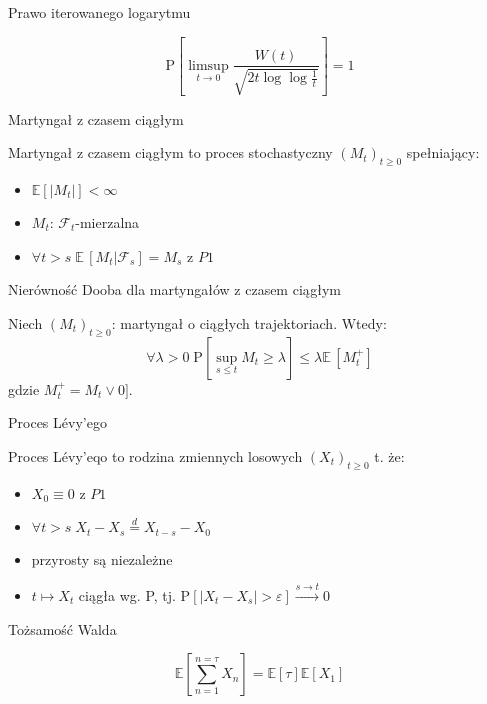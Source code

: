 \documentclass[avery5371,grid,frame]{flashcards}
\begin{document}
\begin{flashcard}[Twierdzenie]{Prawo iterowanego logarytmu}

\smallskip
$$ \text{P} \left[ \limsup _{t \rightarrow 0} \frac{W(t)}{\sqrt{2t \log \log \frac{1}{t} }} \right] = 1 $$
\end{flashcard}


\begin{flashcard}[Definicja]{Martyngał z czasem ciągłym}

\smallskip
Martyngał z czasem ciągłym to proces stochastyczny $(M_t)_{t \geq 0}$ spełniający:
\begin{itemize}
\item $\mathbb{E} [|M_t|] < \infty$
\item $M_t$: $\mathcal{F}_t$-mierzalna
\item $\forall t > s \; \mathbb{E} \, [ M_t | \mathcal{F}_s ] = M_s$ z $P1$
\end{itemize}
\end{flashcard}

\begin{flashcard}[Twierdzenie]{Nierówność Dooba dla martyngałów z czasem ciągłym}

\smallskip
Niech $(M_t)_{t \geq 0}$: martyngał o ciągłych trajektoriach. Wtedy:
$$ \forall \lambda > 0 \; \text{P} \left[ \sup _{s \leq t} M_t \geq \lambda \right] \leq \lambda \mathbb{E} \, [M ^+ _t ] $$
gdzie $ M ^+ _t = M_t \lor 0 ]$.
\end{flashcard}


\begin{flashcard}[Definicja]{Proces Lévy'ego}

\smallskip
Proces Lévy'eqo to rodzina zmiennych losowych $(X_t)_{t \geq 0}$ t. że:
\begin{itemize}
\item $X_0 \equiv 0$ z $P1$
\item $\forall t > s \; X_t - X_s \stackrel{d}{=} X_{t-s} - X_0 $
\item przyrosty są niezależne
\item $ t \mapsto X_t $ ciągła wg. P, tj. $\text{P} [ | X_t -X_s | > \varepsilon ] \stackrel{s \rightarrow t}{\rightarrow} 0 $
\end{itemize}
\end{flashcard}

\begin{flashcard}[Twierdzenie]{Tożsamość Walda}

\smallskip
$$ \mathbb{E} \left[ \sum _{n = 1} ^{n = \tau} X_n \right] = \mathbb{E}\left[\tau \right] \mathbb{E}\left[X_1 \right] $$
\end{flashcard}

\end{document}

